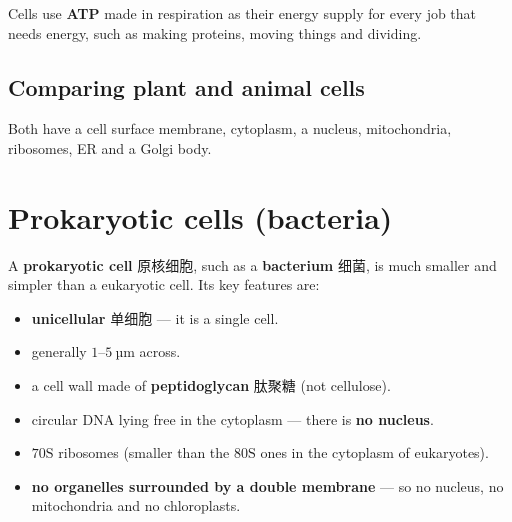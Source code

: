 \documentclass[11pt]{article}
\begin{document}
Cells use \textbf{ATP} made in respiration as their energy supply for every job that needs energy, such as making proteins, moving things and dividing.

\subsection*{Comparing plant and animal cells}

\begin{center}
\end{center}

Both have a cell surface membrane, cytoplasm, a nucleus, mitochondria, ribosomes, ER and a Golgi body.

\section*{Prokaryotic cells (bacteria)}

A \textbf{prokaryotic cell} 原核细胞, such as a \textbf{bacterium} 细菌, is much smaller and simpler than a eukaryotic cell. Its key features are:

\begin{itemize}
\item \textbf{unicellular} 单细胞 — it is a single cell.

\item generally $1$–$5\ \text{µm}$ across.

\item a cell wall made of \textbf{peptidoglycan} 肽聚糖 (not cellulose).

\item circular DNA lying free in the cytoplasm — there is \textbf{no nucleus}.

\item $70\text{S}$ ribosomes (smaller than the $80\text{S}$ ones in the cytoplasm of eukaryotes).

\item \textbf{no organelles surrounded by a double membrane} — so no nucleus, no mitochondria and no chloroplasts.

\end{itemize}
\end{document}
